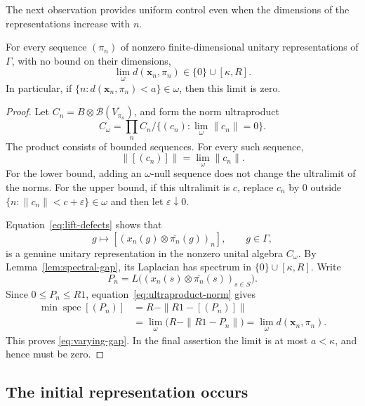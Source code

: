 The next observation provides uniform control even when the dimensions
of the representations increase with $n$.

\begin{lemma}\label{lem:varying-gap}
For every sequence $(\pi_n)$ of nonzero finite-dimensional unitary
representations of $\Gamma$, with no bound on their dimensions,
\begin{equation}
 \lim_\omega d(\mathbf x_n,\pi_n)\in\{0\}\cup[\kappa,R].
 \label{eq:varying-gap}
\end{equation}
In particular, if
$\{n:d(\mathbf x_n,\pi_n)<a\}\in\omega$, then this limit is zero.
\end{lemma}

\begin{proof}
Let $C_n=B\otimes\mathcal B(\overline{V_{\pi_n}})$, and form the norm
ultraproduct
\[
 C_\omega=\prod_n C_n\big/
 \{(c_n):\lim_\omega\|c_n\|=0\}.
\]
The product consists of bounded sequences.  For every such sequence,
\begin{equation}
 \|[(c_n)]\|=\lim_\omega\|c_n\|.
 \label{eq:ultraproduct-norm}
\end{equation}
For the lower bound, adding an $\omega$-null sequence does not change
the ultralimit of the norms.  For the upper bound, if this ultralimit is
$c$, replace $c_n$ by $0$ outside
$\{n:\|c_n\|<c+\varepsilon\}\in\omega$ and then let
$\varepsilon\downarrow0$.

Equation~\eqref{eq:lift-defects} shows that
\[
 g\longmapsto[(x_n(g)\otimes\overline{\pi_n}(g))_n],
 \qquad g\in\Gamma,
\]
is a genuine unitary representation in the nonzero unital algebra
$C_\omega$.  By Lemma~\ref{lem:spectral-gap}, its Laplacian has
spectrum in $\{0\}\cup[\kappa,R]$.  Write
\[
 P_n=L\big((x_n(s)\otimes\overline{\pi_n}(s))_{s\in S}\big).
\]
Since $0\leq P_n\leq R1$, equation~\eqref{eq:ultraproduct-norm} gives
\begin{align*}
 \min\operatorname{spec}[(P_n)]
 &=R-\|R1-[(P_n)]\|\\
 &=\lim_\omega\bigl(R-\|R1-P_n\|\bigr)
 =\lim_\omega d(\mathbf x_n,\pi_n).
\end{align*}
This proves \eqref{eq:varying-gap}.  In the final assertion the limit
is at most $a<\kappa$, and hence must be zero.
\end{proof}

\subsection{The initial representation occurs}

